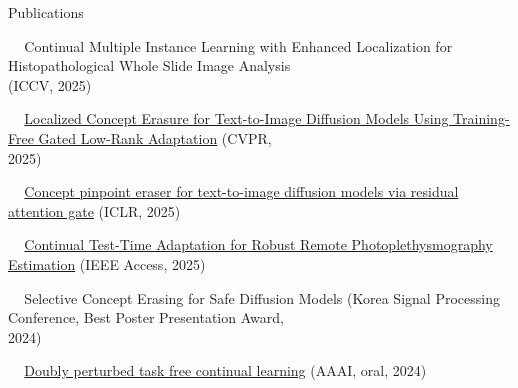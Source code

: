 \documentclass{resume} %
\newcommand{\mycolor}[1]{\textcolor{myurlcolor}{#1}}
\begin{document}
\begin{rSection}{Publications}

\textbullet~\,\, \mycolor{Continual Multiple Instance Learning with Enhanced Localization for Histopathological Whole Slide Image Analysis}
\\ \hspace*{1.5em}(ICCV, 2025)
\\ 



\textbullet~\,\, \href{https://arxiv.org/abs/2503.12356}{Localized Concept Erasure for Text-to-Image Diffusion Models Using Training-Free Gated Low-Rank Adaptation} (CVPR, 
\\ \hspace*{1.5em}2025)
\\ 


\textbullet~\,\, \href{https://arxiv.org/abs/2312.13027}{Concept pinpoint eraser for text-to-image diffusion models via residual attention gate} (ICLR, 2025)
\\ 



\textbullet~\,\, \href{https://ieeexplore.ieee.org/document/10938539}{Continual Test-Time Adaptation for Robust Remote Photoplethysmography Estimation} (IEEE Access, 2025)
\\ 



\textbullet~\,\, {\mycolor{Selective Concept Erasing for Safe Diffusion Models}} (Korea Signal Processing Conference, Best Poster Presentation Award, 
\\ \hspace*{1.5em} 2024)
\\  

\textbullet~\,\, \href{https://arxiv.org/abs/2312.13027}{Doubly perturbed task free continual learning} (AAAI, oral, 2024)
\\ 



\end{rSection}
\end{document}
